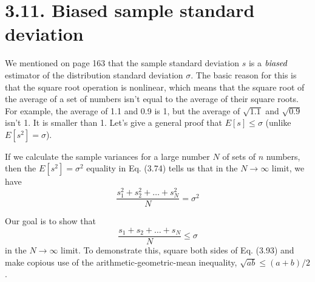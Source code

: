 \section*{3.11. Biased sample standard deviation}
We mentioned on page 163 that the sample standard deviation $s$ is a $\emph{biased}$
estimator of the distribution standard deviation $\sigma$. The basic reason for this
is that  the square root operation is nonlinear, which means that the square
root of the average of a set of numbers isn't equal to the average of their
square roots. For example, the average of 1.1 and 0.9 is 1, but the average of 
$\sqrt{1.1}$ and  $\sqrt{0.9}$ isn't 1. It is smaller than 1. Let's give a general
proof that  $E[s] \leq \sigma$ (unlike  $E[s^2] = \sigma$).

If we calculate the sample variances for a large number $N$ of sets of $n$ numbers,
then the $E[s^2] = \sigma^2$ equality in Eq. (3.74) tells us that in the $N \to \infty$ 
limit, we have
\begin{equation*}\tag{3.92}
    \frac{s_1^2 + s_2^2 + \ldots + s_N^2}{N} = \sigma^2
\end{equation*}

Our goal is to show that
\begin{equation*}\tag{3.93}
    \frac{s_1 + s_2 + \ldots + s_N}{N} \leq \sigma
\end{equation*}
in the $N \to \infty$ limit. To demonstrate this, square both sides of Eq. (3.93)
and make copious use of the arithmetic-geometric-mean inequality, $\sqrt{ab} \leq (a+b)/2$.

\vspace{1em}

